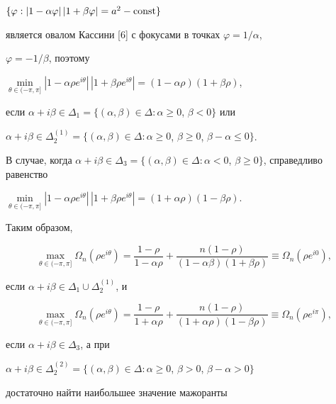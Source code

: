 $\{\varphi: |1-\alpha\varphi|\,|1+\beta\varphi|=a^2 - \operatorname{const}\}$


является овалом Кассини [6] с фокусами в точках $\varphi=1/\alpha$,


$\varphi=-1/\beta$, поэтому


$\min\limits_{\theta\in(-\pi,\pi]}|1-\alpha\rho e^{i\theta}|\,


|1+\beta\rho e^{i\theta}|=(1-\alpha\rho)(1+\beta\rho)$,


если $\alpha+i\beta\in\Delta_1=\{(\alpha,\beta)\in\Delta:


\alpha\ge 0$, $\beta<0\}$ или


$\alpha+i\beta\in\Delta_2^{(1)}=\{(\alpha,\beta)\in\Delta:


\alpha\ge 0$, $\beta\ge 0$, $\beta-\alpha\le 0\}$.


В случае, когда $\alpha+i\beta\in\Delta_3=


\{(\alpha,\beta)\in\Delta: \alpha<0$, $\beta\ge 0 \}$, справедливо равенство


$\min\limits_{\theta\in(-\pi,\pi]}|1-\alpha\rho e^{i\theta}|\,


|1+\beta\rho e^{i\theta}|=(1+\alpha\rho)(1-\beta\rho)$.





Таким образом,


$$


\max\limits_{\theta\in(-\pi,\pi]}\Omega_n(\rho e^{i\theta})=\frac


{1-\rho}{1-\alpha\rho}+\frac{n(1-\rho)}{(1-\alpha\beta)(1+


\beta\rho)}\equiv\Omega_n(\rho e^{i0}),


$$


если $ \alpha+i\beta\in\Delta_1\cup\Delta_2^{(1)}$, и


$$


\max\limits_{\theta\in(-\pi,\pi]}\Omega_n(\rho e^{i\theta})=


\frac{1-\rho}{1+\alpha\rho}+\frac{n(1-\rho)}{(1+\alpha\rho)


(1-\beta\rho)}\equiv\Omega_n(\rho e^{i\pi}),


$$


если $\alpha+i\beta\in\Delta_3$, а при


$\alpha+i\beta\in\Delta_2^{(2)}=\{(\alpha,\beta)\in


\Delta: \alpha\ge 0$, $\beta>0$, $\beta-\alpha>0 \}$


достаточно найти наибольшее значение мажоранты


